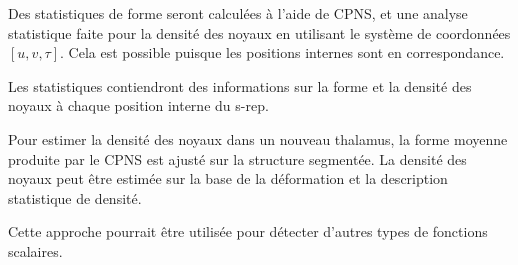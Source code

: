 Des statistiques de forme seront calculées à l'aide de CPNS, et une analyse statistique 
faite pour la densité des noyaux en utilisant le système de coordonnées $[u, v, \tau]$.
Cela est possible puisque les positions internes sont en correspondance.

Les statistiques contiendront des informations sur la forme et la densité des noyaux à chaque position interne du s-rep.

Pour estimer la densité des noyaux dans un nouveau thalamus, la forme moyenne produite par le CPNS est ajusté sur la structure segmentée.
La densité des noyaux peut être estimée sur la base de la déformation et la description statistique de densité.

Cette approche pourrait être utilisée pour détecter d'autres types de fonctions scalaires.